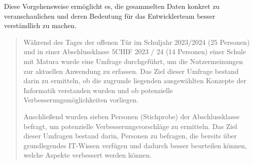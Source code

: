 Diese Vorgehensweise ermöglicht es, die gesammelten Daten konkret zu veranschaulichen und deren Bedeutung für das Entwicklerteam
besser verständlich zu machen.

\begin{quote}
    Während des Tages der offenen Tür im Schuljahr 2023/2024 (25 Personen) und in einer Abschlussklasse 5CHIF 2023 / 24 (14 Personen)
    einer Schule mit Matura wurde eine Umfrage durchgeführt, um die Nutzermeinungen zur aktuellen Anwendung zu erfassen.
    Das Ziel dieser Umfrage bestand darin zu ermitteln, ob die zugrunde liegenden ausgewählten Konzepte der Informatik verstanden wurden und ob
    potenzielle Verbesserungsmöglichkeiten vorliegen.

    Anschließend wurden sieben Personen (Stichprobe) der Abschlussklasse befragt, um potenzielle Verbesserungsvorschläge
    zu ermitteln. Das Ziel dieser Umfragen bestand darin, Personen zu befragen, die bereits über grundlegendes IT-Wissen
    verfügen und dadurch besser beurteilen können, welche Aspekte verbessert werden können.
\end{quote}

